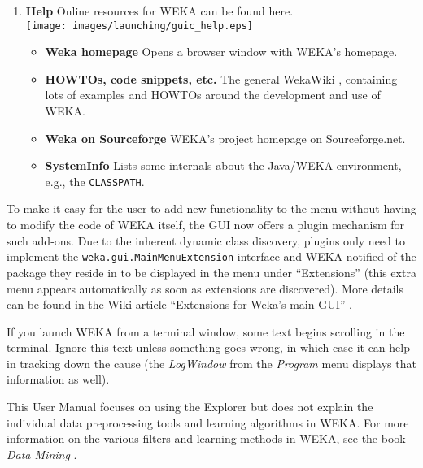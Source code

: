 \begin{enumerate}
		
	\item \textbf{Help} Online resources for WEKA can be found here. \\
	        \texttt{[image: images/launching/guic\_help.eps]}
		\begin{itemize}
			\item \textbf{Weka homepage} Opens a browser window with WEKA's homepage.
			\item \textbf{HOWTOs, code snippets, etc.} The general WekaWiki \cite{wekawiki}, containing lots of examples and HOWTOs around the development and use of WEKA.
			\item \textbf{Weka on Sourceforge} WEKA's project homepage on Sourceforge.net.
			\item \textbf{SystemInfo} Lists some internals about the Java/WEKA environment, e.g., the \texttt{CLASSPATH}.
		\end{itemize}
\end{enumerate}

To make it easy for the user to add new functionality to the menu without having to modify 
the code of WEKA itself, the GUI now offers a plugin mechanism for such add-ons. 
Due to the inherent dynamic
class discovery, plugins only need to implement the \texttt{weka.gui.MainMenuExtension}
interface and WEKA notified of the package they reside in to be displayed in the menu under 
``Extensions'' (this extra menu appears automatically as soon as extensions are discovered). 
More details can be found in the Wiki article ``Extensions for Weka's main GUI'' 
\cite{mainextensions}.

If you launch WEKA from a terminal window, some text begins scrolling in the
terminal. Ignore this text unless something goes wrong, in which case it can
help in tracking down the cause (the \textit{LogWindow} from the \textit{Program} menu 
displays that information as well).

This User Manual focuses on using the Explorer but does not explain
the individual data preprocessing tools and learning algorithms in
WEKA. For more information on the various filters and learning methods
in WEKA, see the book {\em Data Mining} \cite{witten}.
